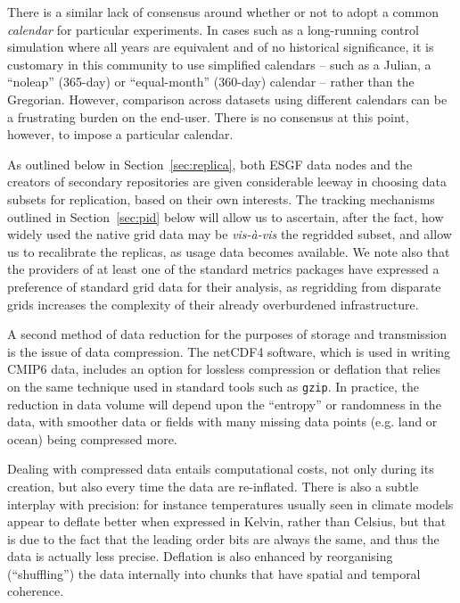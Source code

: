 \documentclass[gmd,manuscript]{copernicus}
\begin{document}
There is a similar lack of consensus around whether or not to adopt a
common \emph{calendar} for particular experiments. In cases such as a
long-running control simulation where all years are equivalent and of
no historical significance, it is customary in this community to use
simplified calendars -- such as a Julian, a ``noleap'' (365-day) or
``equal-month'' (360-day) calendar -- rather than the Gregorian.
However, comparison across datasets using different calendars can be a
frustrating burden on the end-user. There is no consensus at this
point, however, to impose a particular calendar.

As outlined below in Section~\ref{sec:replica}, both ESGF data nodes
and the creators of secondary repositories are given considerable
leeway in choosing data subsets for replication, based on their own
interests. The tracking mechanisms outlined in Section~\ref{sec:pid}
below will allow us to ascertain, after the fact, how widely used the
native grid data may be \emph{vis-\`a-vis} the regridded subset, and
allow us to recalibrate the replicas, as usage data becomes available.
We note also that the providers of at least one of the standard
metrics packages \citep[ESMValTool,][]{ref:eyringetal2016a} have
expressed a preference of standard grid data for their analysis, as
regridding from disparate grids increases the complexity of their
already overburdened infrastructure.

A second method of data reduction for the purposes of storage and
transmission is the issue of data compression. The netCDF4 software,
which is used in writing CMIP6 data, includes an option for lossless
compression or deflation \citep{ref:zivlempel1977} that relies on the
same technique used in standard tools such as \texttt{gzip}. In
practice, the reduction in data volume will depend upon the
``entropy'' or randomness in the data, with smoother data or fields
with many missing data points (e.g. land or ocean) being compressed
more.

Dealing with compressed data entails computational costs, not only
during its creation, but also every time the data are re-inflated.
There is also a subtle interplay with precision: for instance
temperatures usually seen in climate models appear to deflate better
when expressed in Kelvin, rather than Celsius, but that is due to the
fact that the leading order bits are always the same, and thus the
data is actually less precise. Deflation is also enhanced by
reorganising (``shuffling'') the data internally into chunks that have
spatial and temporal coherence.
\end{document}
